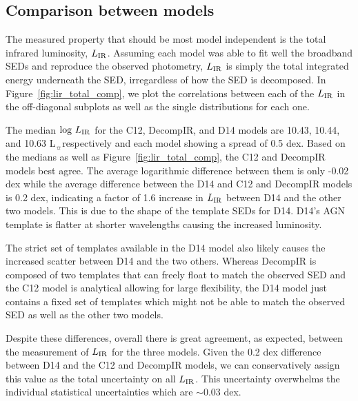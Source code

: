 \documentclass[fleqn, usenatbib]{mnras}
\newcommand{\lsun}{L$_{\sun}$}
\begin{document}
\subsection{Comparison between models}
The measured property that should be most model independent is the total infrared luminosity, $L_{\rm IR}$. Assuming each model was able to fit well the broadband SEDs and reproduce the observed photometry, $L_{\rm IR}$ is simply the total integrated energy underneath the SED, irregardless of how the SED is decomposed. In Figure~\ref{fig:lir_total_comp}, we plot the correlations between each of the $L_{\rm IR}$ in the off-diagonal subplots as well as the single distributions for each one. 

The median $\log\,L_{\rm IR}$ for the C12, DecompIR, and D14 models are 10.43, 10.44, and 10.63 \lsun respectively and each model showing a spread of 0.5 dex. Based on the medians as well as Figure~\ref{fig:lir_total_comp}, the C12 and DecompIR models best agree. The average logarithmic difference between them is only -0.02 dex while the average difference between the D14 and C12 and DecompIR models is 0.2 dex, indicating a factor of 1.6 increase in $L_{\rm IR}$ between D14 and the other two models. This is due to the shape of the template SEDs for D14. D14's AGN template is flatter at shorter wavelengths causing the increased luminosity. 

The strict set of templates available in the D14 model also likely causes the increased scatter between D14 and the two others. Whereas DecompIR is composed of two templates that can freely float to match the observed SED and the C12 model is analytical allowing for large flexibility, the D14 model just contains a fixed set of templates which might not be able to match the observed SED as well as the other two models.

Despite these differences, overall there is great agreement, as expected, between the measurement of $L_{\rm IR}$ for the three models. Given the 0.2 dex difference between D14 and the C12 and DecompIR models, we can conservatively assign this value as the total uncertainty on all $L_{\rm IR}$. This uncertainty overwhelms the individual statistical uncertainties which are $\sim0.03$ dex.
\end{document}
